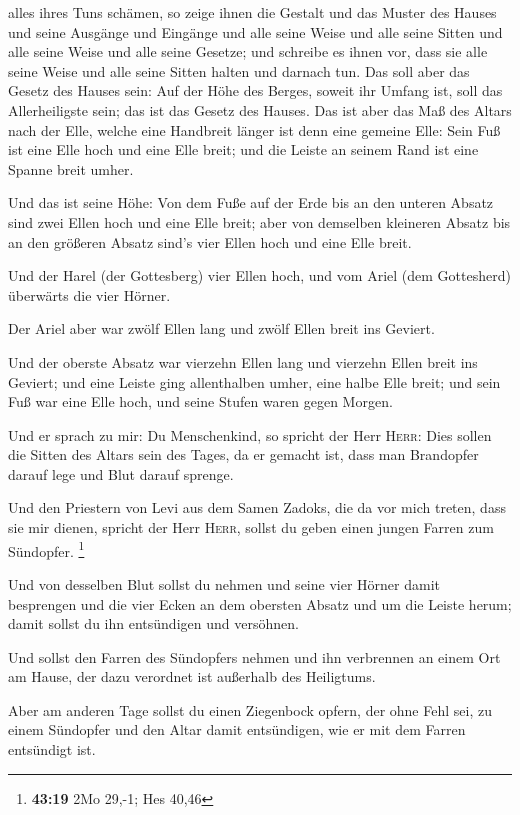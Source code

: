alles ihres Tuns schämen, so zeige ihnen die Gestalt und das Muster des
Hauses und seine Ausgänge und Eingänge und alle seine Weise und alle
seine Sitten und alle seine Weise und alle seine Gesetze; und schreibe
es ihnen vor, dass sie alle seine Weise und alle seine Sitten halten und
darnach tun.  Das soll aber das Gesetz des Hauses sein:
Auf der Höhe des Berges, soweit ihr Umfang ist, soll das Allerheiligste
sein; das ist das Gesetz des Hauses.  Das ist aber das
Maß des Altars nach der Elle, welche eine Handbreit länger ist denn eine
gemeine Elle: Sein Fuß ist eine Elle hoch und eine Elle breit; und die
Leiste an seinem Rand ist eine Spanne breit umher.

 Und das ist seine Höhe: Von dem Fuße auf der Erde bis an
den unteren Absatz sind zwei Ellen hoch und eine Elle breit; aber von
demselben kleineren Absatz bis an den größeren Absatz sind's vier Ellen
hoch und eine Elle breit.

 Und der Harel (der Gottesberg) vier Ellen hoch, und vom
Ariel (dem Gottesherd) überwärts die vier Hörner.

 Der Ariel aber war zwölf Ellen lang und zwölf Ellen
breit ins Geviert.

 Und der oberste Absatz war vierzehn Ellen lang und
vierzehn Ellen breit ins Geviert; und eine Leiste ging allenthalben
umher, eine halbe Elle breit; und sein Fuß war eine Elle hoch, und seine
Stufen waren gegen Morgen.

 Und er sprach zu mir: Du Menschenkind, so spricht der
Herr \textsc{Herr}: Dies sollen die Sitten des Altars sein des Tages, da
er gemacht ist, dass man Brandopfer darauf lege und Blut darauf sprenge.

 Und den Priestern von Levi aus dem Samen Zadoks, die da
vor mich treten, dass sie mir dienen, spricht der Herr \textsc{Herr},
sollst du geben einen jungen Farren zum Sündopfer. \footnote{\textbf{43:19}
  2Mo 29,-1; Hes 40,46}

 Und von desselben Blut sollst du nehmen und seine vier
Hörner damit besprengen und die vier Ecken an dem obersten Absatz und um
die Leiste herum; damit sollst du ihn entsündigen und versöhnen.

 Und sollst den Farren des Sündopfers nehmen und ihn
verbrennen an einem Ort am Hause, der dazu verordnet ist außerhalb des
Heiligtums.

 Aber am anderen Tage sollst du einen Ziegenbock opfern,
der ohne Fehl sei, zu einem Sündopfer und den Altar damit entsündigen,
wie er mit dem Farren entsündigt ist.

